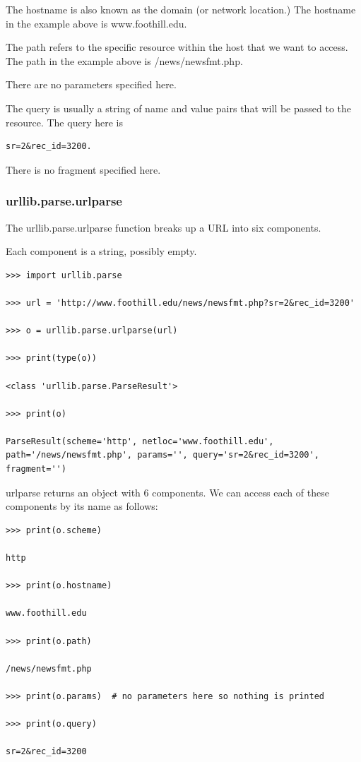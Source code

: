 \documentclass{article}
\begin{document}
The hostname is also known as the domain (or network location.)  The hostname in the example above is  www.foothill.edu.   

The path refers to the specific resource within the host that we want to access.  The path in the example above is  /news/newsfmt.php. 

There are no parameters specified here.     

The query is usually a string of name and value pairs that will be passed to the resource.  The query here is 
\begin{lstlisting}
sr=2&rec_id=3200.
\end{lstlisting}

There is no fragment specified here.

\subsubsection{urllib.parse.urlparse}
The urllib.parse.urlparse function  breaks up a URL into six components. 

Each component is a string, possibly empty.

\begin{lstlisting}
>>> import urllib.parse

>>> url = 'http://www.foothill.edu/news/newsfmt.php?sr=2&rec_id=3200'

>>> o = urllib.parse.urlparse(url)

>>> print(type(o))

<class 'urllib.parse.ParseResult'>

>>> print(o)

ParseResult(scheme='http', netloc='www.foothill.edu', path='/news/newsfmt.php', params='', query='sr=2&rec_id=3200', fragment='')
\end{lstlisting}

urlparse returns an object with 6 components.  We can access each of these components by its name as follows:

\begin{lstlisting}
>>> print(o.scheme)

http

>>> print(o.hostname)

www.foothill.edu

>>> print(o.path)

/news/newsfmt.php

>>> print(o.params)  # no parameters here so nothing is printed

>>> print(o.query) 

sr=2&rec_id=3200
\end{lstlisting}
\end{document}
